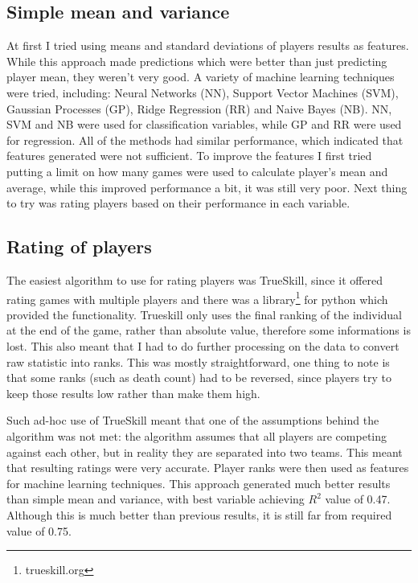 \documentclass[12pt,a4paper]{book}
\begin{document}
\subsection{Simple mean and variance}
At first I tried using means and standard deviations of players results as features.
While this approach made predictions which were better than just predicting player mean, they weren't very good.
A variety of machine learning techniques were tried, including: Neural Networks (NN), Support Vector Machines (SVM), Gaussian Processes (GP), Ridge Regression (RR) and Naive Bayes (NB).
NN, SVM and NB were used for classification variables, while GP and RR were used for regression.
All of the methods had similar performance, which indicated that features generated were not sufficient.
To improve the features I first tried putting a limit on how many games were used to calculate player's mean and average, while this improved performance a bit, it was still very poor.
Next thing to try was rating players based on their performance in each variable.

\subsection{Rating of players}
The easiest algorithm to use for rating players was TrueSkill, since it offered rating games with multiple players and there was a library\footnote{trueskill.org} for python which provided the functionality.
Trueskill only uses the final ranking of the individual at the end of the game, rather than absolute value, therefore some informations is lost.
This also meant that I had to do further processing on the data to convert raw statistic into ranks.
This was mostly straightforward, one thing to note is that some ranks (such as death count) had to be reversed, since players try to keep those results low rather than make them high.

Such ad-hoc use of TrueSkill meant that one of the assumptions behind the algorithm was not met:
the algorithm assumes that all players are competing against each other, but in reality they are separated into two teams.
This meant that resulting ratings were very accurate.
Player ranks were then used as features for machine learning techniques.
This approach generated much better results than simple mean and variance, with best variable achieving $R^2$ value of 0.47.
Although this is much better than previous results, it is still far from required value of 0.75.
\end{document}
